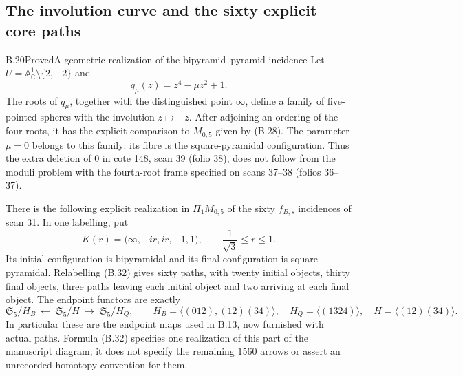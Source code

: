 
\subsection{The involution curve and the sixty explicit core paths}

\begin{result}{B.20}{Proved}{A geometric realization of the bipyramid--pyramid incidence}
Let $U=\mathbb A^1_{\mathbb C}\setminus\{2,-2\}$ and
\[
 q_\mu(z)=z^4-\mu z^2+1.
\]
The roots of $q_\mu$, together with the distinguished point
$\infty$, define a family of five-pointed spheres with the
involution $z\mapsto-z$.  After adjoining an ordering of the
four roots, it has the explicit comparison to $M_{0,5}$ given
by (B.28).  The parameter $\mu=0$ belongs to this family:
its fibre is the square-pyramidal configuration.  Thus the
extra deletion of $0$ in cote 148, scan 39 (folio 38), does not
follow from the moduli problem with the fourth-root frame
specified on scans 37--38 (folios 36--37).

There is the following explicit realization in $\Pi_1M_{0,5}$
of the sixty $f_{B,s}$ incidences of scan 31.  In one labelling,
put
\[
 K(r)=\bigl(\infty,-ir,ir,-1,1\bigr),
 \qquad \frac1{\sqrt3}\leq r\leq1.                 \tag{B.32}
\]
Its initial configuration is bipyramidal and its final
configuration is square-pyramidal.  Relabelling (B.32) gives
sixty paths, with twenty initial objects, thirty final objects,
three paths leaving each initial object and two arriving at
each final object.  The endpoint functors are exactly
\[
 \mathfrak S_5/H_B\ \longleftarrow\
 \mathfrak S_5/H\ \longrightarrow\ \mathfrak S_5/H_Q,
 \qquad
 H_B=\langle(012),(12)(34)\rangle,\quad
 H_Q=\langle(1324)\rangle,\quad
 H=\langle(12)(34)\rangle.                         \tag{B.33}
\]
In particular these are the endpoint maps used in B.13,
now furnished with actual paths.  Formula (B.32) specifies
one realization of this part of the manuscript diagram;
it does not specify the remaining $1560$ arrows or assert
an unrecorded homotopy convention for them.
\end{result}
